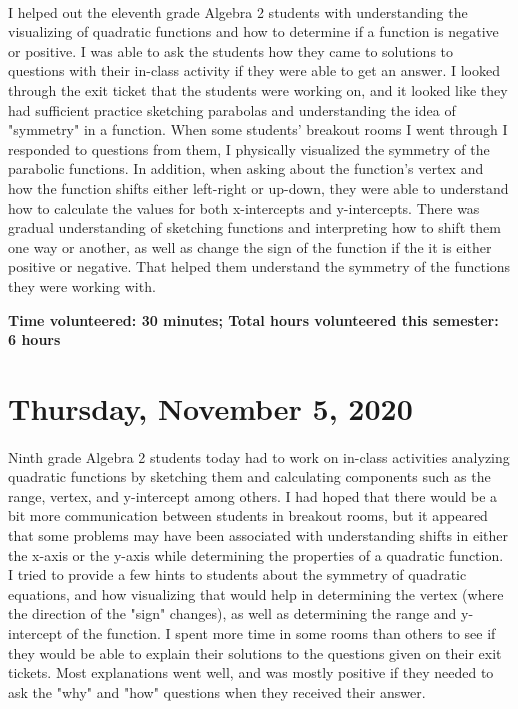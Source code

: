 \documentclass{article}
\begin{document}
\paragraph{}I helped out the eleventh grade Algebra 2 students with understanding the visualizing of quadratic functions and how to determine if a function is negative or positive. I was able to ask the students how they came to solutions to questions with their in-class activity if they were able to get an answer. I looked through the exit ticket that the students were working on, and it looked like they had sufficient practice sketching parabolas and understanding the idea of "symmetry" in a function. When some students' breakout rooms I went through I responded to questions from them, I physically visualized the symmetry of the parabolic functions. In addition, when asking about the function's vertex and how the function shifts either left-right or up-down, they were able to understand how to calculate the values for both x-intercepts and y-intercepts. There was gradual understanding of sketching functions and interpreting how to shift them one way or another, as well as change the sign of the function if the it is either positive or negative. That helped them understand the symmetry of the functions they were working with.


\textbf{Time volunteered: 30 minutes; Total hours volunteered this semester: 6 hours}

\section{Thursday, November 5, 2020}

\paragraph{}Ninth grade Algebra 2 students today had to work on in-class activities analyzing quadratic functions by sketching them and calculating components such as the range, vertex, and y-intercept among others. I had hoped that there would be a bit more communication between students in breakout rooms, but it appeared that some problems may have been associated with understanding shifts in either the x-axis or the y-axis while determining the properties of a quadratic function. I tried to provide a few hints to students about the symmetry of quadratic equations, and how visualizing that would help in determining the vertex (where the direction of the "sign" changes), as well as determining the range and y-intercept of the function. I spent more time in some rooms than others to see if they would be able to explain their solutions to the questions given on their exit tickets. Most explanations went well, and was mostly positive if they needed to ask the "why" and "how" questions when they received their answer. 
\end{document}
